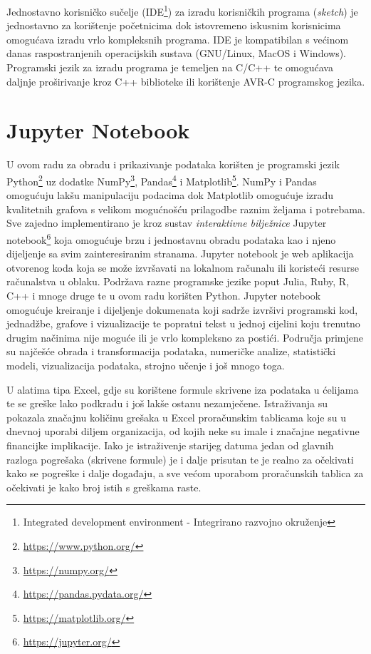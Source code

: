 Jednostavno korisničko sučelje (IDE\footnote{Integrated development environment - Integrirano razvojno okruženje}) za izradu korisničkih programa (\textit{sketch}) je jednostavno za korištenje početnicima dok istovremeno iskusnim korisnicima omogućava izradu vrlo kompleksnih programa.
IDE je kompatibilan s većinom danas raspostranjenih operacijskih sustava (GNU/Linux, MacOS i Windows).
Programski jezik za izradu programa je temeljen na C/C++ te omogućava daljnje proširivanje kroz C++ biblioteke ili korištenje AVR-C programskog jezika.

\section{Jupyter Notebook}
U ovom radu za obradu i prikazivanje podataka korišten je programski jezik Python\footnote{\url{https://www.python.org/}} uz dodatke NumPy\footnote{\url{https://numpy.org/}}, Pandas\footnote{\url{https://pandas.pydata.org/}} i Matplotlib\footnote{\url{https://matplotlib.org/}}.
NumPy i Pandas omogućuju lakšu manipulaciju podacima dok Matplotlib omogućuje izradu kvalitetnih grafova s velikom mogućnošću prilagodbe raznim željama i potrebama.
Sve zajedno implementirano je kroz sustav \emph{interaktivne bilježnice} Jupyter notebook\footnote{\url{https://jupyter.org/}} koja omogućuje brzu i jednostavnu obradu podataka kao i njeno dijeljenje sa svim zainteresiranim stranama.
Jupyter notebook je web aplikacija otvorenog koda koja se može izvršavati na lokalnom računalu ili koristeći resurse računalstva u oblaku.
Podržava razne programske jezike poput Julia, Ruby, R, C++ i mnoge druge te u ovom radu korišten Python.
Jupyter notebook omogućuje kreiranje i dijeljenje dokumenata koji sadrže izvršivi programski kod, jednadžbe, grafove i vizualizacije te popratni tekst u jednoj cijelini koju trenutno drugim načinima nije moguće ili je vrlo kompleksno za postići.
Područja primjene su najčešće obrada i transformacija podataka, numeričke analize, statistički modeli, vizualizacija podataka, strojno učenje i još mnogo toga.

U alatima tipa Excel, gdje su korištene formule skrivene iza podataka u ćelijama te se greške lako podkradu i još lakše ostanu nezamječene. 
Istraživanja su pokazala značajnu količinu grešaka u Excel proračunskim tablicama koje su u dnevnoj uporabi diljem organizacija, od kojih neke su imale i značajne negativne financijke implikacije\cite{panko1998we}. 
Iako je istraživenje starijeg datuma jedan od glavnih razloga pogrešaka (skrivene formule) je i dalje prisutan te je realno za očekivati kako se pogreške i dalje događaju, a sve većom uporabom proračunskih tablica za očekivati je kako broj istih s greškama raste.

